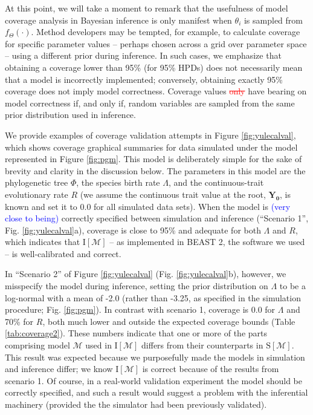 \documentclass[oneside]{article}
\begin{document}
At this point, we will take a moment to remark that the usefulness of model coverage analysis in Bayesian inference is only manifest when $\theta_i$ is sampled from $f_\Theta(\cdot)$.
Method developers may be tempted, for example, to calculate coverage for specific parameter values -- perhaps chosen across a grid over parameter space -- using a different prior during inference.
In such cases, we emphasize that obtaining a coverage lower than 95\% (for 95\% HPDs) does not necessarily mean that a model is incorrectly implemented; conversely, obtaining exactly 95\% coverage does not imply model correctness.
Coverage values \textcolor{red}{\st{only}} have bearing on model correctness if, and only if, random variables are sampled from the same prior distribution used in inference. 

We provide examples of coverage validation attempts in Figure \ref{fig:yulecalval}, which shows coverage graphical summaries for data simulated under the model represented in Figure \ref{fig:pgm}.
This model is deliberately simple for the sake of brevity and clarity in the discussion below.
The parameters in this model are the phylogenetic tree $\Phi$, the species birth rate $\Lambda$, and the continuous-trait evolutionary rate $R$ (we assume the continuous trait value at the root, $\boldsymbol{Y_0}$, is known and set it to $\boldsymbol{0.0}$ for all simulated data sets).
When the model is \textcolor{blue}{(very close to being)} correctly specified between simulation and inference (``Scenario 1'', Fig. \ref{fig:yulecalval}a), coverage is close to 95\% and adequate for both $\Lambda$ and $R$, which indicates that $\text{I}[\mathcal{M}]$ -- as implemented in BEAST 2, the software we used -- is well-calibrated and correct.

In ``Scenario 2'' of Figure \ref{fig:yulecalval} (Fig. \ref{fig:yulecalval}b), however, we misspecify the model during inference, setting the prior distribution on $\Lambda$ to be a log-normal with a mean of -2.0 (rather than -3.25, as specified in the simulation procedure; Fig. \ref{fig:pgm}).
In contrast with scenario 1, coverage is 0.0 for $\Lambda$ and 70\% for $R$, both much lower and outside the expected coverage bounds (Table \ref{tab:coverage2}).
These numbers indicate that one or more of the parts comprising model $\mathcal{M}$ used in $\text{I}[\mathcal{M}]$ differs from their counterparts in $\text{S}[\mathcal{M}]$.
This result was expected because we purposefully made the models in simulation and inference differ; we know $\text{I}[\mathcal{M}]$ is correct because of the results from scenario 1.
Of course, in a real-world validation experiment the model should be correctly specified, and such a result would suggest a problem with the inferential machinery (provided the the simulator had been previously validated).
\end{document}
